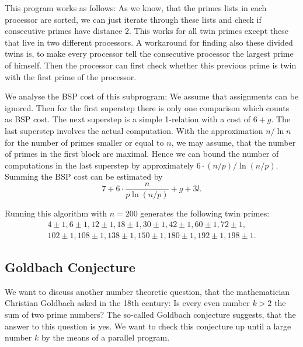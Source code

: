 \documentclass[a4paper,12pt]{article}
\newtheorem{theorem}{Theorem}
\newcommand{\bigO}{\mathcal{O}}
\begin{document}
This program works as follows:
As we know, that the  primes lists in each processor are sorted,
we can just iterate through these lists and check if consecutive primes have distance $2$.
This works for all twin primes except these that live in two different processors.
A workaround for finding also these divided twins is, to make every processor tell the consecutive processor the largest prime of himself.
Then the processor can first check whether this previous prime is twin with the first prime of the processor.

We analyse the BSP cost of this subprogram:
We assume that assignments can be ignored.
Then for the first superstep there is only one comparison which counts as BSP cost.
The next superstep is a simple 1-relation with a cost of $6+g$.
The last superstep involves the actual computation.
With the approximation $n/\ln n$ for the number of primes smaller or equal to $n$, we may assume, that the number of primes in the first block are maximal.
Hence we can bound the number of computations in the last superstep by approximately $6\cdot (n/p) / \ln(n/p)$.
Summing the BSP cost can be estimated by
\[
	7 + 6\cdot\frac{n}{p\ln(n/p)} + g + 3l.
\]

Running this algorithm with $n=200$ generates the following twin primes:
\begin{align*}
4\pm1,
6\pm1,
12\pm1,
18\pm1, 
30\pm1, 
42\pm1, 
60\pm1, 
72\pm1,\\
102\pm1,
108\pm1,
138\pm1,
150\pm1,
180\pm1,
192\pm1,
198\pm1.
\end{align*}


\subsection{Goldbach Conjecture}

We want to discuss another number theoretic question, that the mathematician Christian Goldbach asked in the 18th century:
Is every even number $k > 2$ the sum of two prime numbers?
The so-called Goldbach conjecture suggests, that the answer to this question is yes.
We want to check this conjecture up until a large number $k$ by the means of a parallel program.
\end{document}
